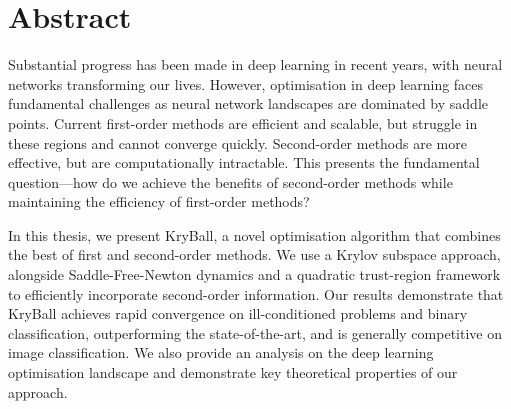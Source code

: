 \chapter*{Abstract}

Substantial progress has been made in deep learning in recent years, with neural networks transforming our lives. However, optimisation in deep learning faces fundamental challenges as neural network landscapes are dominated by saddle points. Current first-order methods are efficient and scalable, but struggle in these regions and cannot converge quickly. Second-order methods are more effective, but are computationally intractable. This presents the fundamental question---how do we achieve the benefits of second-order methods while maintaining the efficiency of first-order methods?

In this thesis, we present KryBall, a novel optimisation algorithm that combines the best of first and second-order methods. We use a Krylov subspace approach, alongside Saddle-Free-Newton dynamics and a quadratic trust-region framework to efficiently incorporate second-order information. Our results demonstrate that KryBall achieves rapid convergence on ill-conditioned problems and binary classification, outperforming the state-of-the-art, and is generally competitive on image classification. We also provide an analysis on the deep learning optimisation landscape and demonstrate key theoretical properties of our approach.